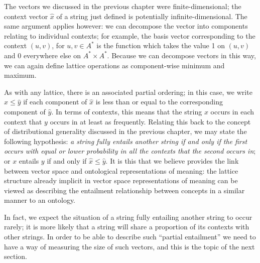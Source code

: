 The vectors we discussed in the previous chapter were finite-dimensional; the context vector $\hat{x}$ of a string just defined is potentially infinite-dimensional. The same argument applies however: we can decompose the vector into components relating to individual contexts; for example, the basis vector corresponding to the context $(u,v)$, for $u,v \in A^*$ is the function which takes the value 1 on $(u,v)$ and 0 everywhere else on $A^*\times A^*$. Because we can decompose vectors in this way, we can again define lattice operations as component-wise minimum and maximum.

As with any lattice, there is an associated partial ordering; in this case, we write $\hat{x} \le \hat{y}$ if each component of $\hat{x}$ is less than or equal to the corresponding component of $\hat{y}$. In terms of contexts, this means that the string $x$ occurs in each context that $y$ occurs in at least as frequently. Relating this back to the concept of distributional generality discussed in the previous chapter, we may state the following hypothesis: \emph{a string fully entails another string if and only if the first occurs with equal or lower probability in all the contexts that the second occurs in}; or $x$ entails $y$ if and only if $\hat{x} \le \hat{y}$. It is this that we believe provides the link between vector space and ontological representations of meaning: the lattice structure already implicit in vector space representations of meaning can be viewed as describing the entailment relationship between concepts in a similar manner to an ontology.

In fact, we expect the situation of a string fully entailing another string to occur rarely; it is more likely that a string will share a proportion of its contexts with other strings. In order to be able to describe such ``partial entailment'' we need to have a way of measuring the size of such vectors, and this is the topic of the next section.




